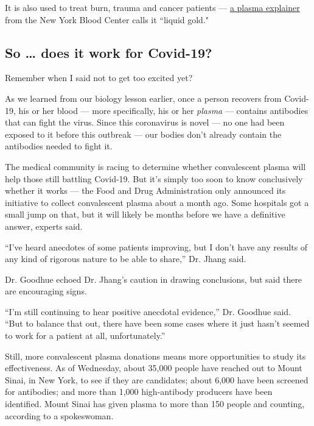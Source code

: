 It is also used to treat burn, trauma and cancer patients ---
\href{https://www.nybc.org/media/nybloodcenter/filer_public/74/2a/742a70e5-bca4-4390-b279-58063bc8a61a/nybc_about_donation_flyers_plasma.pdf}{a
plasma explainer} from the New York Blood Center calls it ``liquid
gold."

\hypertarget{so--does-it-work-for-covid-19}{%
\subsection{So \ldots{} does it work for
Covid-19?}\label{so--does-it-work-for-covid-19}}

Remember when I said not to get too excited yet?

As we learned from our biology lesson earlier, once a person recovers
from Covid-19, his or her blood --- more specifically, his or her
\emph{plasma} --- contains antibodies that can fight the virus. Since
this coronavirus is novel --- no one had been exposed to it before this
outbreak --- our bodies don't already contain the antibodies needed to
fight it.

The medical community is racing to determine whether convalescent plasma
will help those still battling Covid-19. But it's simply too soon to
know conclusively whether it works --- the Food and Drug Administration
only announced its initiative to collect convalescent plasma about a
month ago. Some hospitals got a small jump on that, but it will likely
be months before we have a definitive answer, experts said.

``I've heard anecdotes of some patients improving, but I don't have any
results of any kind of rigorous nature to be able to share,'' Dr. Jhang
said.

Dr. Goodhue echoed Dr. Jhang's caution in drawing conclusions, but said
there are encouraging signs.

``I'm still continuing to hear positive anecdotal evidence,'' Dr.
Goodhue said. ``But to balance that out, there have been some cases
where it just hasn't seemed to work for a patient at all,
unfortunately.''

Still, more convalescent plasma donations means more opportunities to
study its effectiveness. As of Wednesday, about 35,000 people have
reached out to Mount Sinai, in New York, to see if they are candidates;
about 6,000 have been screened for antibodies; and more than 1,000
high-antibody producers have been identified. Mount Sinai has given
plasma to more than 150 people and counting, according to a spokeswoman.

